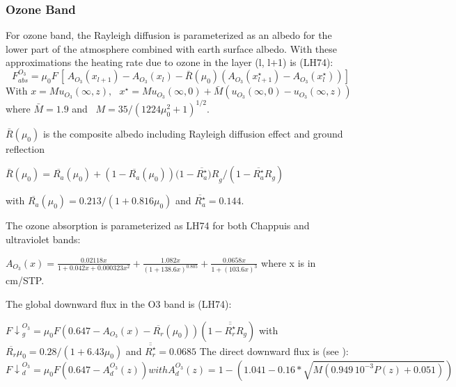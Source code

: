 \subsubsection{Ozone Band}

For ozone band, the Rayleigh diffusion is parameterized as an albedo for the
lower part of the atmosphere combined with earth surface albedo. With these
approximations the heating rate due to ozone in the layer (l, l$+$1) is
(LH74):
\begin{equation}
F_{abs}^{O_{3}}=\mu_{0}F\, [\, A_{O_{3}}\left( x_{l+1} \right)-A_{O_{3}}\left( x_{l}
\right)-\bar{R}(\mu_{0})\left( A_{O_{3}}\left( x_{l+1}^{\star }
\right)-A_{O_{3}}\left( x_{l}^{\star } \right) \right)]
\end{equation}
With $x=Mu_{O_{3}}\left( \infty ,z \right),\, \, \, \, x^{\star }=Mu_{O_{3}}\left(
\infty ,0 \right)+\bar{M}(u_{O_{3}}\left( \infty ,0 \right)-u_{O_{3}}\left( \infty
,z \right))$ \\
where $\bar{M}=1.9$ and $\, \, \, M=35/{(1224\mu
_{0}^{2}+1)}^{1/2}$.

$\bar{R}(\mu_{0})$ is the composite albedo including Rayleigh diffusion
effect and ground reflection

$\bar{R}\left( \mu_{0} \right)=\overline{R_{a}}\left( \mu_{0}
\right)+(1-\overline{R_{a}}\left( \mu_{0} \right))(1-\overline{R_{a}^{\star
}}{)R}_{g}/(1-\overline{R_{a}^{\star }}R_{g})$

with $\overline{R_{a}}\left( \mu_{0}
\right)=0.213/(1+0.816\mu_{0})$ and $\overline{R_{a}^{\star }}=0.144$.

The ozone absorption is parameterized as LH74 for both Chappuis and
ultraviolet bands:

$A_{O_{3}}\left( x
\right)=\frac{0.02118x}{1+0.042x+0.000323x^{2}}+\frac{1.082x}{{(1+138.6x)}^{0.805}}+\frac{0.0658x}{1+{(103.6x)}^{3}}$
where x is in cm/STP.


The global downward flux in the O3 band is (LH74):

${F\downarrow}_{g}^{O_{3}}=\mu_{0}F(0.647-A_{O_{3}}\left( x
\right)-\overline{R_{r}}\left( \mu_{0} \right))(1-
\overline{\overline{R_{r}^{\star }}}
R_{g})$
\newline
with $\overline{R_{r}} \mu_{0}=0.28/(1+6.43\mu_{0})$
\newline
and $\overline{\overline{R_{r}^{\star }}}=0.0685$
\newline
\newline
The direct downward flux is (see \cite{Atwater:1978}):
\begin{equation}
{F\downarrow }_{d}^{O_{3}}=\mu_{0}F\left( 0.647-A_{d}^{O_{3}}\left( z \right)
\right)with
A_{d}^{O_{3}}\left( z \right)=1-(1.041-0.16\ast \sqrt {M\left( 0.949\,
{10}^{-3}P\left( z \right)+0.051 \right)} )
\end{equation}

